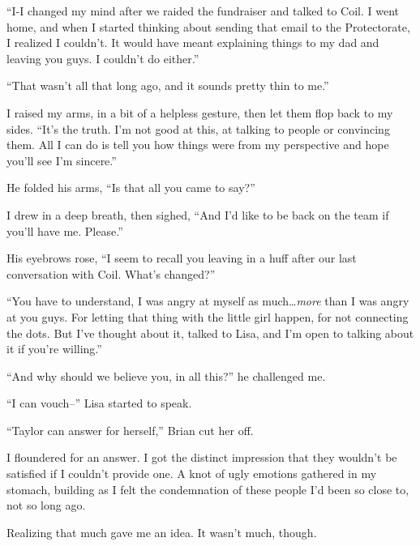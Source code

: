 ``I-I changed my mind after we raided the fundraiser and talked to Coil.  I went home, and when I started thinking about sending that email to the Protectorate, I realized I couldn't.  It would have meant explaining things to my dad and leaving you guys.  I couldn't do either.''



``That wasn't all that long ago, and it sounds pretty thin to me.''



I raised my arms, in a bit of a helpless gesture, then let them flop back to my sides.  ``It's the truth.  I'm not good at this, at talking to people or convincing them.  All I can do is tell you how things were from my perspective and hope you'll see I'm sincere.''



He folded his arms, ``Is that all you came to say?''



I drew in a deep breath, then sighed, ``And I'd like to be back on the team if you'll have me.  Please.''



His eyebrows rose, ``I seem to recall you leaving in a huff after our last conversation with Coil.  What's changed?''



``You have to understand, I was angry at myself as much\ldots \emph{more} than I was angry at you guys.  For letting that thing with the little girl happen, for not connecting the dots.  But I've thought about it, talked to Lisa, and I'm open to talking about it if you're willing.''



``And why should we believe you, in all this?'' he challenged me.



``I can vouch--'' Lisa started to speak.



``Taylor can answer for herself,'' Brian cut her off.



I floundered for an answer.  I got the distinct impression that they wouldn't be satisfied if I couldn't provide one.  A knot of ugly emotions gathered in my stomach, building as I felt the condemnation of these people I'd been so close to, not so long ago.



Realizing that much gave me an idea.  It wasn't much, though.



